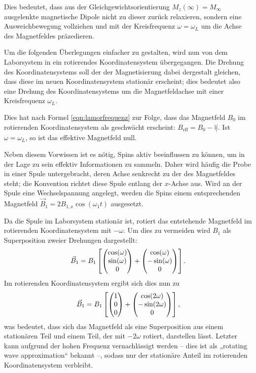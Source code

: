 Dies bedeutet, dass aus der Gleichgewichtsorientierung $M_z(\infty) = M_\infty$ ausgelenkte magnetische Dipole nicht zu dieser zurück relaxieren, sondern eine Ausweichbewegung vollziehen und mit der Kreisfrequenz $\omega = \omega_L$ um die Achse des Magnetfeldes präzedieren.

Um die folgenden Überlegungen einfacher zu gestalten, wird nun von dem Laborsystem in ein rotierendes Koordinatensystem übergegangen. Die Drehung des Koordinatensystems soll der der Magnetisierung dabei dergestalt gleichen, dass diese im neuen Koordinatensystem stationär erscheint; dies bedeutet also eine Drehung des Koordinatensystems um die Magnetfeldachse mit einer Kreisfrequenz $\omega_L$.

Dies hat nach Formel \eqref{eqn:lamorfrequenz} zur Folge, dass das Magnetfeld $B_0$ im rotierenden Koordinatensystem als geschwächt erscheint: $B_\text{eff} = B_0 - \frac{\omega}{\gamma}$. Ist $\omega = \omega_L$, so ist das effektive Magnetfeld null.


Neben diesem Vorwissen ist es nötig, Spins aktiv beeinflussen zu können, um in der Lage zu sein effektiv Informationen zu sammeln. Daher wird häufig die Probe in einer Spule untergebracht, deren Achse senkrecht zu der des Magnetfeldes steht; die Konvention richtet diese Spule entlang der $x$-Achse aus. Wird an der Spule eine Wechselspannung angelegt, werden die Spins einem entsprechenden Magnetfeld $\vec{B}_1 = 2 B_{1,x} \cos(\omega_1 t)$ ausgesetzt.

Da die Spule im Laborsystem stationär ist, rotiert das entstehende Magnetfeld im rotierenden Koordinatensystem mit $-\omega$. Um dies zu vermeiden wird $B_1$ als Superposition zweier Drehungen dargestellt:
\begin{align}
    \vec{B}_1 = B_1 \left[ \begin{pmatrix}\cos(\omega) \\ \sin(\omega) \\ 0\end{pmatrix} + 
                      \begin{pmatrix}\cos(\omega) \\ -\sin(\omega) \\ 0\end{pmatrix} \right].
\end{align}
Im rotierenden Koordinatensystem ergibt sich dies nun zu
\begin{align}
    \vec{B}_1 = B_1 \left[ \begin{pmatrix}1 \\ 0 \\ 0\end{pmatrix} + 
                      \begin{pmatrix}\cos(2\omega) \\ -\sin(2\omega) \\ 0\end{pmatrix} \right],
\end{align}
was bedeutet, dass sich das Magnetfeld als eine Superposition aus einem stationären Teil und einem Teil, der mit $-2\omega$ rotiert, darstellen lässt. Letzter kann aufgrund der hohen Frequenz vernachlässigt werden -- dies ist als „rotating wave approximation“ bekannt --, sodass nur der stationäre Anteil im rotierenden Koordinatensystem verbleibt.

